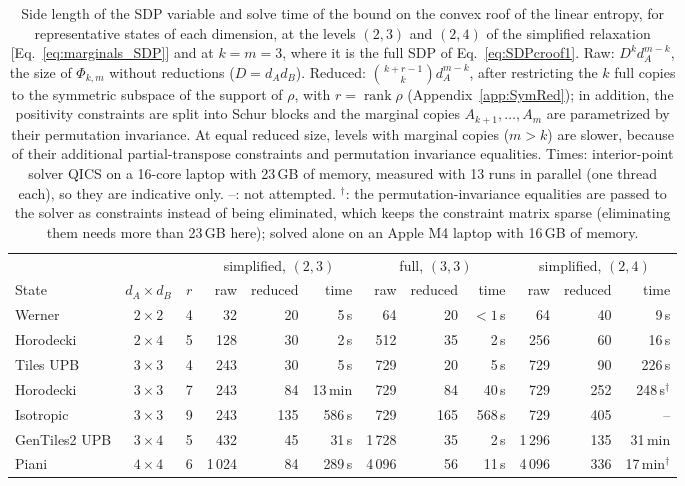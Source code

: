 \begin{table}
  \centering
  \begin{tabular}{l c c rrr rrr rrr}
    \toprule
    & & & \multicolumn{3}{c}{simplified, $(2,3)$} & \multicolumn{3}{c}{full, $(3,3)$} & \multicolumn{3}{c}{simplified, $(2,4)$} \\
    \cmidrule(lr){4-6}\cmidrule(lr){7-9}\cmidrule(lr){10-12}
    State & $d_A\times d_B$ & $r$ & raw & reduced & time & raw & reduced & time & raw & reduced & time \\
    \midrule
        Werner & $2\times2$ & 4 & 32 & 20 & 5\,s & 64 & 20 & $<1$\,s & 64 & 40 & 9\,s \\
    Horodecki & $2\times4$ & 5 & 128 & 30 & 2\,s & 512 & 35 & 2\,s & 256 & 60 & 16\,s \\
    Tiles UPB & $3\times3$ & 4 & 243 & 30 & 5\,s & 729 & 20 & 5\,s & 729 & 90 & 226\,s \\
    Horodecki & $3\times3$ & 7 & 243 & 84 & 13\,min & 729 & 84 & 40\,s & 729 & 252 & 248\,s$^\dagger$ \\
    Isotropic & $3\times3$ & 9 & 243 & 135 & 586\,s & 729 & 165 & 568\,s & 729 & 405 & -- \\
    GenTiles2 UPB & $3\times4$ & 5 & 432 & 45 & 31\,s & 1\,728 & 35 & 2\,s & 1\,296 & 135 & 31\,min \\
    Piani & $4\times4$ & 6 & 1\,024 & 84 & 289\,s & 4\,096 & 56 & 11\,s & 4\,096 & 336 & 17\,min$^\dagger$ \\
    \bottomrule
  \end{tabular}
  \caption{Side length of the SDP variable and solve time of the bound on the convex roof of the linear entropy, for
  representative states of each dimension, at the levels $(2,3)$ and $(2,4)$ of the simplified relaxation
  [Eq.~\eqref{eq:marginals_SDP}] and at $k=m=3$, where it is the full SDP of Eq.~\eqref{eq:SDPcroof1}. Raw:
  $D^k d_A^{m-k}$, the size of $\Phi_{k,m}$ without reductions ($D=d_Ad_B$). Reduced: $\binom{k+r-1}{k}d_A^{m-k}$,
  after restricting the $k$ full copies to the symmetric subspace of the support of $\rho$, with $r=\operatorname{rank}\rho$
  (Appendix~\ref{app:SymRed}); in addition, the positivity constraints are split into Schur blocks and the marginal
  copies $A_{k+1},\dots,A_m$ are parametrized by their permutation invariance. At equal reduced size, levels with
  marginal copies ($m>k$) are slower, because of their additional partial-transpose constraints and permutation
  invariance equalities. Times: interior-point solver QICS on a
  16-core laptop with 23\,GB of memory, measured with 13 runs in parallel (one thread each), so they are indicative
  only. --: not attempted. $^\dagger$: the permutation-invariance equalities are passed to the solver as constraints
  instead of being eliminated, which keeps the constraint matrix sparse (eliminating them needs more than 23\,GB here);
  solved alone on an Apple M4 laptop with 16\,GB of memory.}
  \label{tab:dimensions}
\end{table}
